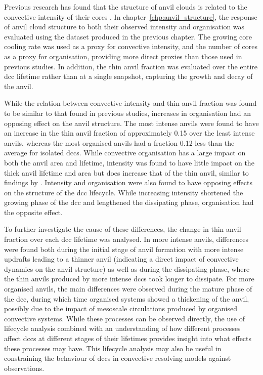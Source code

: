 Previous research has found that the structure of anvil clouds is related to the convective intensity of their cores \citep{protopapadaki_upper_2017, takahashi_relationships_2017}.
In chapter~\ref{chp:anvil_structure}, the response of anvil cloud structure to both their observed intensity and organisation was evaluated using the dataset produced in the previous chapter.
The growing core cooling rate was used as a proxy for convective intensity, and the number of cores as a proxy for organisation, providing more direct proxies than those used in previous studies.
In addition, the thin anvil fraction was evaluated over the entire \acrshort{dcc} lifetime rather than at a single snapshot, capturing the growth and decay of the anvil.

While the relation between convective intensity and thin anvil fraction was found to be similar to that found in previous studies, increases in organisation had an opposing effect on the anvil structure.
The most intense anvils were found to have an increase in the thin anvil fraction of approximately 0.15 over the least intense anvils, whereas the most organised anvils had a fraction 0.12 less than the average for isolated \acrshort{dcc}s.
While convective organisation has a large impact on both the anvil area and lifetime, intensity was found to have little impact on the thick anvil lifetime and area but does increase that of the thin anvil, similar to findings by \citet{sokol_greater_2024}.
Intensity and organisation were also found to have opposing effects on the structure of the \acrshort{dcc} lifecycle.
While increasing intensity shortened the growing phase of the \acrshort{dcc} and lengthened the dissipating phase, organisation had the opposite effect.

To further investigate the cause of these differences, the change in thin anvil fraction over each \acrshort{dcc} lifetime was analysed.
In more intense anvils, differences were found both during the initial stage of anvil formation with more intense updrafts leading to a thinner anvil (indicating a direct impact of convective dynamics on the anvil structure) as well as during the dissipating phase, where the thin anvils produced by more intense \acrshort{dcc}s took longer to dissipate.
For more organised anvils, the main differences were observed during the mature phase of the \acrshort{dcc}, during which time organised systems showed a thickening of the anvil, possibly due to the impact of mesoscale circulations produced by organised convective systems.
While these processes can be observed directly, the use of lifecycle analysis combined with an understanding of how different processes affect \acrshort{dcc}s at different stages of their lifetimes provides insight into what effects these processes may have.
This lifecycle analysis may also be useful in constraining the behaviour of \acrshort{dcc}s in convective resolving models against observations.

